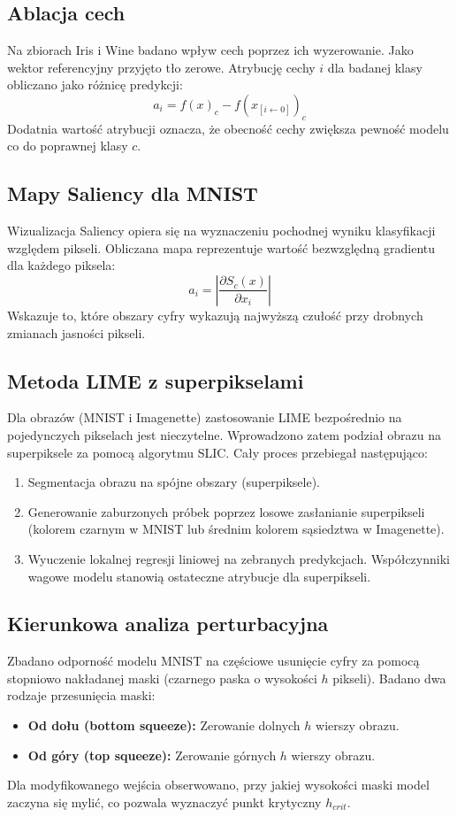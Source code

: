 \documentclass[conference]{IEEEtran}
\begin{document}
\subsection{Ablacja cech}
Na zbiorach Iris i Wine badano wpływ cech poprzez ich wyzerowanie. Jako wektor referencyjny przyjęto tło zerowe. Atrybucję cechy $i$ dla badanej klasy obliczano jako różnicę predykcji:
\begin{equation}
a_i = f(x)_c - f(x_{[i \leftarrow 0]})_c
\end{equation}
Dodatnia wartość atrybucji oznacza, że obecność cechy zwiększa pewność modelu co do poprawnej klasy $c$.

\subsection{Mapy Saliency dla MNIST}
Wizualizacja Saliency opiera się na wyznaczeniu pochodnej wyniku klasyfikacji względem pikseli. Obliczana mapa reprezentuje wartość bezwzględną gradientu dla każdego piksela:
\begin{equation}
a_i = \left| \frac{\partial S_c(x)}{\partial x_i} \right|
\end{equation}
Wskazuje to, które obszary cyfry wykazują najwyższą czułość przy drobnych zmianach jasności pikseli.

\subsection{Metoda LIME z superpikselami}
Dla obrazów (MNIST i Imagenette) zastosowanie LIME bezpośrednio na pojedynczych pikselach jest nieczytelne. Wprowadzono zatem podział obrazu na superpiksele za pomocą algorytmu SLIC. Cały proces przebiegał następująco:
\begin{enumerate}
    \item Segmentacja obrazu na spójne obszary (superpiksele).
    \item Generowanie zaburzonych próbek poprzez losowe zasłanianie superpikseli (kolorem czarnym w MNIST lub średnim kolorem sąsiedztwa w Imagenette).
    \item Wyuczenie lokalnej regresji liniowej na zebranych predykcjach. Współczynniki wagowe modelu stanowią ostateczne atrybucje dla superpikseli.
\end{enumerate}

\subsection{Kierunkowa analiza perturbacyjna}
Zbadano odporność modelu MNIST na częściowe usunięcie cyfry za pomocą stopniowo nakładanej maski (czarnego paska o wysokości $h$ pikseli). Badano dwa rodzaje przesunięcia maski:
\begin{itemize}
    \item \textbf{Od dołu (bottom squeeze):} Zerowanie dolnych $h$ wierszy obrazu.
    \item \textbf{Od góry (top squeeze):} Zerowanie górnych $h$ wierszy obrazu.
\end{itemize}
Dla modyfikowanego wejścia obserwowano, przy jakiej wysokości maski model zaczyna się mylić, co pozwala wyznaczyć punkt krytyczny $h_{crit}$.
\end{document}
